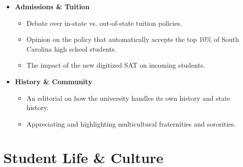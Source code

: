 \documentclass{article}
\begin{document}
\begin{itemize}
  \begin{itemize}
  \item
    The university's decision to stop paying for
    the schedule planner feature, making class registration more
    difficult for students.
  \item
    The gap between high school and college education in South Carolina,
    noting how different schools had better resources.
  \item
    How alumni feel about their UofSC education and its value in the job
    market.
  \end{itemize}
\item
  \textbf{Admissions \& Tuition}

  \begin{itemize}
  \item
    Debate over in-state vs. out-of-state tuition policies.
  \item
    Opinion on the policy that automatically accepts the top 10\% of
    South Carolina high school students.
  \item
    The impact of the new digitized SAT on incoming students.
  \end{itemize}
\item
  \textbf{History \& Community}

  \begin{itemize}
  \item
    An editorial on how the university handles its own history and state
    history.
  \item
    Appreciating and highlighting multicultural fraternities and
    sororities.
  \end{itemize}
\end{itemize}

\section*{Student Life \& Culture}
\end{document}
